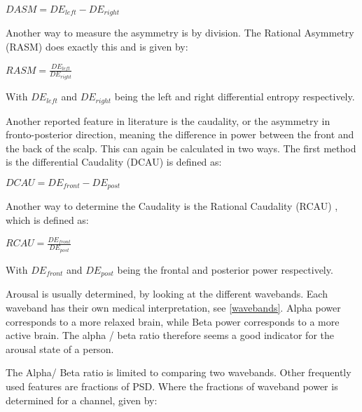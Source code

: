 \begin{center}
$DASM = DE_{left} - DE_{right}$
\end{center}

Another way to measure the asymmetry is by division. The Rational Asymmetry (RASM)  does exactly this and is given by: \\

\begin{center}
$RASM = \frac{DE_{left}}{DE_{right}}$
\end{center}

With $DE_{left}$ and $DE_{right}$ being the left and right differential entropy respectively.

\npar

Another reported feature in literature is the caudality, or the asymmetry in fronto-posterior direction\cite{caudality}, meaning the difference in power between the front and the back of the scalp. This can again be calculated in two ways. The first method is the differential Caudality (DCAU)  is defined as: \\

\begin{center}
$DCAU = DE_{front} - DE_{post}$
\end{center}

Another way to determine the Caudality is the Rational Caudality (RCAU) , which is defined as:

\begin{center}
$RCAU = \frac{DE_{front}}{DE_{post}}$
\end{center}

With $DE_{front}$ and $DE_{post}$ being the frontal and posterior power respectively.

\npar

Arousal is usually determined, by looking at the different wavebands\citep{ExtendedPaper}. Each waveband has their own medical interpretation, see \ref{wavebands}. Alpha power corresponds to a more relaxed brain, while Beta power corresponds to a more active brain. The alpha / beta ratio therefore seems a good indicator for the arousal state of a person.

\npar

The Alpha/ Beta ratio is limited to comparing two wavebands. Other frequently used features are fractions of PSD. Where the fractions of waveband power is determined for a channel, given by:


